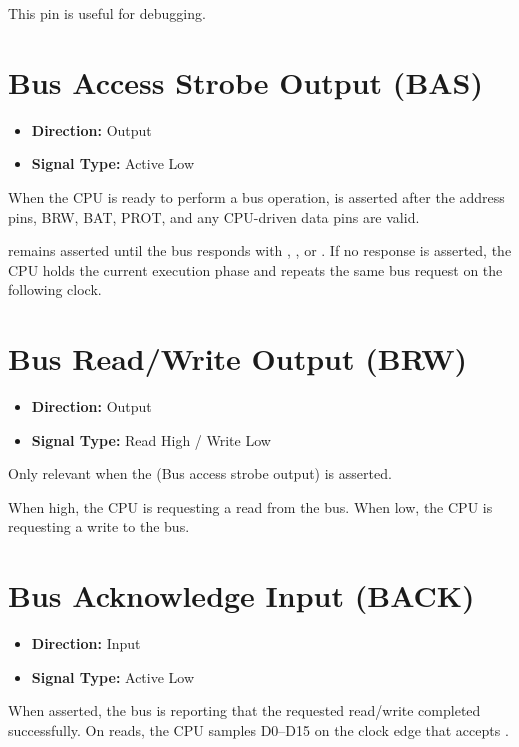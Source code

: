 This pin is useful for debugging.

\section{Bus Access Strobe Output (BAS)}

\begin{itemize}
	\item \textbf{Direction:} Output
	\item \textbf{Signal Type:} Active Low
\end{itemize}

When the CPU is ready to perform a bus operation,  is asserted after the address pins, BRW, BAT, PROT,
and any CPU-driven data pins are valid.

 remains asserted until the bus responds with , , or . If no response is asserted, the CPU holds the
current execution phase and repeats the same bus request on the following clock.

\section{Bus Read/Write Output (BRW)}

\begin{itemize}
	\item \textbf{Direction:} Output
	\item \textbf{Signal Type:} Read High / Write Low
\end{itemize}

Only relevant when the  (Bus access strobe output) is asserted.

When high, the CPU is requesting a read from the bus. When low, the CPU is requesting a write to the bus.

\section{Bus Acknowledge Input (BACK)}

\begin{itemize}
	\item \textbf{Direction:} Input
	\item \textbf{Signal Type:} Active Low
\end{itemize}

When asserted, the bus is reporting that the requested read/write completed successfully. On reads, the CPU samples
D0--D15 on the clock edge that accepts .

